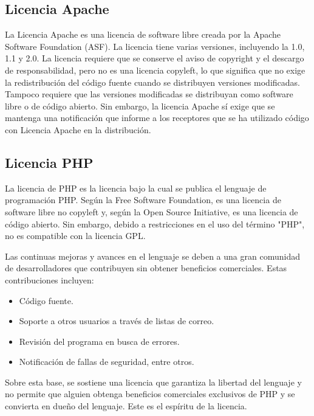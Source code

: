 			\subsection{Licencia Apache}\label{apsl}
			
				La Licencia Apache es una licencia de software libre creada por la Apache Software Foundation (ASF). La licencia tiene varias versiones, incluyendo la 1.0, 1.1 y 2.0. La licencia requiere que se conserve el aviso de copyright y el descargo de responsabilidad, pero no es una licencia copyleft, lo que significa que no exige la redistribución del código fuente cuando se distribuyen versiones modificadas. Tampoco requiere que las versiones modificadas se distribuyan como software libre o de código abierto. Sin embargo, la licencia Apache sí exige que se mantenga una notificación que informe a los receptores que se ha utilizado código con Licencia Apache en la distribución.\par
				
			\subsection{Licencia PHP}
			
				La licencia de PHP es la licencia bajo la cual se publica el lenguaje de programación PHP. Según la Free Software Foundation, es una licencia de software libre no copyleft y, según la Open Source Initiative, es una licencia de código abierto. Sin embargo, debido a restricciones en el uso del término "PHP", no es compatible con la licencia GPL.\par 
				Las continuas mejoras y avances en el lenguaje se deben a una gran comunidad de desarrolladores que contribuyen sin obtener beneficios comerciales. Estas contribuciones incluyen:
				
				\begin{itemize}
					\item Código fuente.
    				\item Soporte a otros usuarios a través de listas de correo.
   					\item Revisión del programa en busca de errores.
    				\item Notificación de fallas de seguridad, entre otros.
				\end{itemize}
				
Sobre esta base, se sostiene una licencia que garantiza la libertad del lenguaje y no permite que alguien obtenga beneficios comerciales exclusivos de PHP y se convierta en dueño del lenguaje. Este es el espíritu de la licencia.\par

